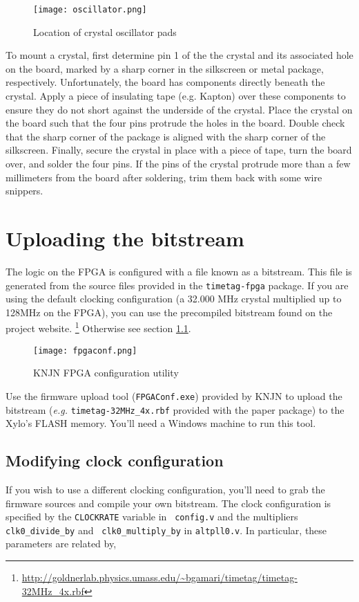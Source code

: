 \begin{figure}
  \center
  \texttt{[image: oscillator.png]}
  \caption{Location of crystal oscillator pads}
  \label{fig:crystal}
\end{figure}

To mount a crystal, first determine pin 1 of the the crystal and its
associated hole on the board, marked by a sharp corner in the
silkscreen or metal package, respectively. Unfortunately, the board
has components directly beneath the crystal. Apply a piece of
insulating tape (e.g. Kapton) over these components to ensure they do
not short against the underside of the crystal. Place the crystal on
the board such that the four pins protrude the holes in the
board. Double check that the sharp corner of the package is aligned
with the sharp corner of the silkscreen. Finally, secure the crystal
in place with a piece of tape, turn the board over, and solder the
four pins. If the pins of the crystal protrude more than a few
millimeters from the board after soldering, trim them back with some
wire snippers.

\section{Uploading the bitstream}
\label{Sec:UploadingBitstream}

The logic on the FPGA is configured with a file known as a
bitstream. This file is generated from the source files provided in
the {\tt timetag-fpga} package.  If you are using the default clocking
configuration (a 32.000 MHz crystal multiplied up to 128MHz on the
FPGA), you can use the precompiled bitstream found on the project
website.
\footnote{\url{http://goldnerlab.physics.umass.edu/~bgamari/timetag/timetag-32MHz\_4x.rbf}}
Otherwise see section \ref{Sec:ModifyingClock}.

\begin{figure}
  \center
  \texttt{[image: fpgaconf.png]}
  \caption{KNJN FPGA configuration utility}
  \label{fig:fpgaconf}
\end{figure}

Use the firmware upload tool ({\tt FPGAConf.exe}) provided by KNJN to
upload the bitstream ({\it e.g.} {\tt timetag-32MHz\_4x.rbf} provided
with the paper package) to the Xylo's FLASH memory. You'll need a
Windows machine to run this tool.

\subsection{Modifying clock configuration}
\label{Sec:ModifyingClock}
If you wish to use a different clocking configuration, you'll need to
grab the firmware sources and compile your own bitstream. The clock
configuration is specified by the {\tt CLOCKRATE} variable in {\tt
config.v} and the multipliers {\tt clk0\_divide\_by} and {\tt
clk0\_multiply\_by} in {\tt altpll0.v}. In particular, these parameters
are related by,

